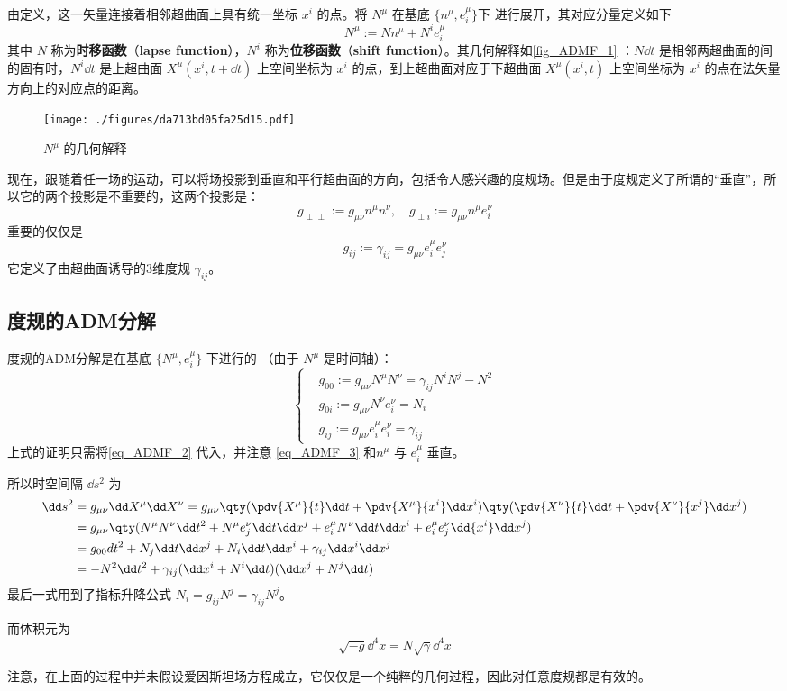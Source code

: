 由定义，这一矢量连接着相邻超曲面上具有统一坐标 $x^i$ 的点。将 $N^\mu$ 在基底 $\{n^\mu,e^\mu_i\}$下 进行展开，其对应分量定义如下
\begin{equation}\label{eq_ADMF_2}
N^\mu:=Nn^\mu+N^ie^\mu_i
\end{equation}
其中 $N$ 称为\textbf{时移函数}（\textbf{lapse function}），$N^i$ 称为\textbf{位移函数}（\textbf{shift function}）。其几何解释如\autoref{fig_ADMF_1} ：$N\dd t$ 是相邻两超曲面的间的固有时，$N^i\dd t$ 是上超曲面 $X^\mu(x^i,t+\dd t)$ 上空间坐标为 $x^i$ 的点，到上超曲面对应于下超曲面 $X^\mu(x^i,t)$ 上空间坐标为 $x^i$ 的点在法矢量方向上的对应点的距离。
\begin{figure}[ht]
\centering
\texttt{[image: ./figures/da713bd05fa25d15.pdf]}
\caption{$N^\mu$ 的几何解释} \label{fig_ADMF_1}
\end{figure}

现在，跟随着任一场的运动，可以将场投影到垂直和平行超曲面的方向，包括令人感兴趣的度规场。但是由于度规定义了所谓的“垂直”，所以它的两个投影是不重要的，这两个投影是：
\begin{equation}
g_{\perp\perp}:=g_{\mu\nu}n^{\mu}n^{\nu},\quad g_{\perp i}:=g_{\mu\nu}n^{\mu}e^{\nu}_i
\end{equation}
重要的仅仅是
\begin{equation}\label{eq_ADMF_3}
g_{ij}:=\gamma_{ij}=g_{\mu\nu}e^{\mu}_ie^{\nu}_j
\end{equation}
它定义了由超曲面诱导的3维度规 $\gamma_{ij}$。
\subsection{度规的ADM分解}
度规的ADM分解是在基底 $\{N^{\mu},e^{\mu}_i\}$ 下进行的 （由于 $N^{\mu}$ 是时间轴）：
\begin{equation}
\left\{\begin{aligned}
&g_{00}:=g_{\mu\nu}N^{\mu}N^{\nu}=\gamma_{ij}N^iN^j-N^2\\
&g_{0i}:=g_{\mu\nu}N^{\nu}e^{\nu}_i=N_i\\
&g_{ij}:=g_{\mu\nu}e^{\mu}_ie^{\nu}_i=\gamma_{ij}
\end{aligned}\right.
\end{equation}
上式的证明只需将\autoref{eq_ADMF_2} 代入，并注意 \autoref{eq_ADMF_3} 和$n^\mu$ 与 $e^{\mu}_i$ 垂直。

所以时空间隔 $\dd s^2$ 为
\begin{equation}
\begin{aligned}
\dd s^2&=g_{\mu\nu}\dd X^\mu\dd X^\nu=g_{\mu\nu}\qty(\pdv{X^\mu}{t}\dd t+\pdv{X^\mu}{x^i}\dd x^i)\qty(\pdv{X^\nu}{t}\dd t+\pdv{X^\nu}{x^j}\dd x^j)\\
&=g_{\mu\nu}\qty(N^\mu N^\nu\dd t^2+N^\mu e^\nu_j\dd t\dd x^j+e^\mu_iN^\nu\dd t\dd x^i+e^{\mu}_ie^{\nu}_j\dd {x^i}\dd x^j)\\
&=g_{00}dt^2+N_j\dd t\dd x^j+N_i\dd t\dd x^i+\gamma_{ij}\dd x^i\dd x^j\\
&=-N^2\dd t^2+\gamma_{ij}(\dd x^i+N^i\dd t)(\dd x^j+N^j\dd t)
\end{aligned}
\end{equation}
最后一式用到了指标升降公式 $N_i=g_{ij}N^j=\gamma_{ij}N^j$。

而体积元为
\begin{equation}\label{eq_ADMF_4}
\sqrt{-g}{\dd}^4 x=N\sqrt{\gamma}{\dd}^4x
\end{equation}

注意，在上面的过程中并未假设爱因斯坦场方程成立，它仅仅是一个纯粹的几何过程，因此对任意度规都是有效的。